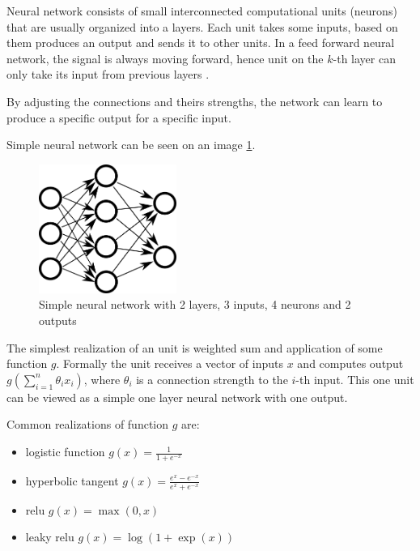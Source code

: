     Neural network consists of small interconnected computational units (neurons) that are usually organized into a layers.
    Each unit takes some inputs, based on them produces an output and sends it to other units. 
    In a feed forward neural network, the signal is always moving forward,
    hence unit on the $k$-th layer can only take its input from previous layers \cite{Goodfellow-et-al-2016}.
    
    By adjusting the connections and theirs strengths, the network can learn to produce a specific output for a specific input.
    
    Simple neural network can be seen on an image \ref{obr:siet}.
    
    \begin{figure}[h]
    \centerline{\includegraphics[width=0.4\textwidth]{images/neural_network}}
    \caption[Simple neural network with 2 layers, 3 inputs, 4 neurons and 2 outputs]{Simple neural network with 2 layers, 3 inputs, 4 neurons and 2 outputs\*} %
    \label{obr:siet}
    \end{figure}
    
    The simplest realization of an unit is weighted sum and application of some function $g$. 
    Formally the unit receives a vector of inputs $x$ and computes output $g(\sum_{i=1}^n \theta_i x_i)$, 
    where $\theta_i$ is a connection strength to the $i$-th input.
    This one unit can be viewed as a simple one layer neural network with one output.
    
    Common realizations of function $g$ are: 
    \begin{itemize}
        \item logistic function $g(x) = \frac{1}{1+e^{-x}}$
        \item hyperbolic tangent $g(x)=\frac{e^x-e^{-x}}{e^x+e^{-x}}$
        \item relu $g(x) = \max(0,x)$ 
        \item leaky relu $g(x)=\log(1+\exp(x))$
    \end{itemize}
    

